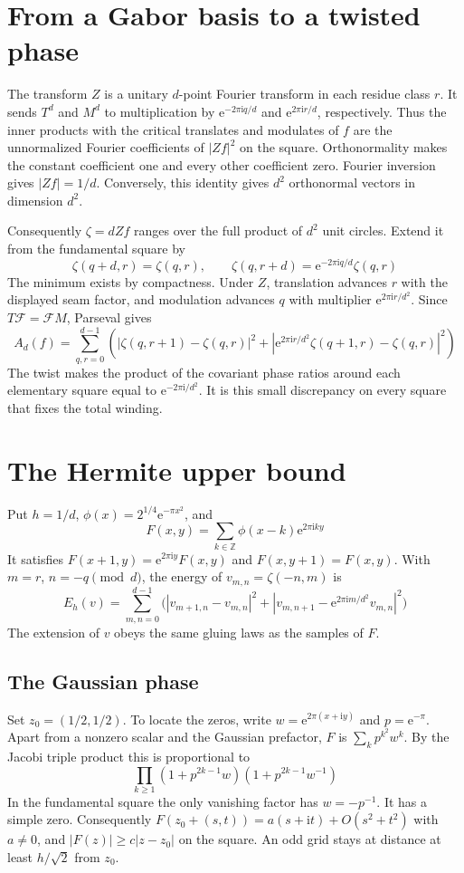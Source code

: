 \documentclass[11pt,reqno]{amsart}
\newcommand{\Z}{\mathbb Z}
\newcommand{\ii}{\mathrm i}
\newcommand{\e}{\mathrm e}
\begin{document}
\section{From a Gabor basis to a twisted phase}
The transform $Z$ is a unitary $d$-point Fourier transform in each residue class $r$. It sends $T^d$ and $M^d$ to multiplication by $\e^{-2\pi\ii q/d}$ and $\e^{2\pi\ii r/d}$, respectively. Thus the inner products with the critical translates and modulates of $f$ are the unnormalized Fourier coefficients of $|Zf|^2$ on the square. Orthonormality makes the constant coefficient one and every other coefficient zero. Fourier inversion gives $|Zf|=1/d$. Conversely, this identity gives $d^2$ orthonormal vectors in dimension $d^2$.

Consequently $\zeta=dZf$ ranges over the full product of $d^2$ unit circles. Extend it from the fundamental square by
\[
 \zeta(q+d,r)=\zeta(q,r),\qquad
 \zeta(q,r+d)=\e^{-2\pi\ii q/d}\zeta(q,r)
\]
The minimum exists by compactness. Under $Z$, translation advances $r$ with the displayed seam factor, and modulation advances $q$ with multiplier $\e^{2\pi\ii r/d^2}$. Since $T\mathcal F=\mathcal F M$, Parseval gives
\begin{equation}\label{eq:energy}
 A_d(f)=\sum_{q,r=0}^{d-1}\left(
 |\zeta(q,r+1)-\zeta(q,r)|^2+
 |\e^{2\pi\ii r/d^2}\zeta(q+1,r)-\zeta(q,r)|^2\right)
\end{equation}
The twist makes the product of the covariant phase ratios around each elementary square equal to $\e^{-2\pi\ii/d^2}$. It is this small discrepancy on every square that fixes the total winding.

\section{The Hermite upper bound}
Put $h=1/d$, $\phi(x)=2^{1/4}\e^{-\pi x^2}$, and
\[
 F(x,y)=\sum_{k\in\Z}\phi(x-k)\e^{2\pi\ii ky}
\]
It satisfies $F(x+1,y)=\e^{2\pi\ii y}F(x,y)$ and $F(x,y+1)=F(x,y)$. With $m=r$, $n=-q\pmod d$, the energy of $v_{m,n}=\zeta(-n,m)$ is
\begin{equation}\label{eq:gauge}
 E_h(v)=\sum_{m,n=0}^{d-1}\bigl(|v_{m+1,n}-v_{m,n}|^2+
 |v_{m,n+1}-\e^{2\pi\ii m/d^2}v_{m,n}|^2\bigr)
\end{equation}
The extension of $v$ obeys the same gluing laws as the samples of $F$.

\subsection{The Gaussian phase}
Set $z_0=(1/2,1/2)$. To locate the zeros, write $w=\e^{2\pi(x+\ii y)}$ and $p=\e^{-\pi}$. Apart from a nonzero scalar and the Gaussian prefactor, $F$ is $\sum_k p^{k^2}w^k$. By the Jacobi triple product this is proportional to
\[
 \prod_{k\ge1}(1+p^{2k-1}w)(1+p^{2k-1}w^{-1})
\]
In the fundamental square the only vanishing factor has $w=-p^{-1}$. It has a simple zero. Consequently $F(z_0+(s,t))=a(s+\ii t)+O(s^2+t^2)$ with $a\ne0$, and $|F(z)|\ge c|z-z_0|$ on the square. An odd grid stays at distance at least $h/\sqrt2$ from $z_0$.
\end{document}
